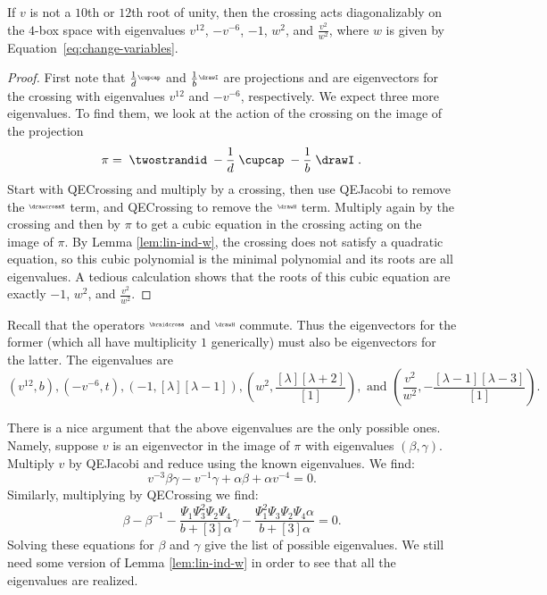 \documentclass[12pt]{amsart}
\begin{document}
\begin{lemma}\label{lem:eigenvalues-twist}
If $v$ is not a $10$th or $12$th root of unity, then the crossing acts
diagonalizably on the $4$-box space with eigenvalues $v^{12}$, $-v^{-6}$,
$-1$, $w^2$, and $\frac{v^2}{w^2}$, where $w$ is given by
Equation~\eqref{eq:change-variables}.
\end{lemma}
\begin{proof}
First note that $\frac{1}{d} \raisebox{0.8mm}{\scalebox{0.5}{\cupcap}}$ and $\frac{1}{b} \raisebox{0.8mm}{\scalebox{0.5}{\drawI}}$ are projections
and are eigenvectors for the crossing with eigenvalues $v^{12}$ and
$-v^{-6}$, respectively. We expect three more eigenvalues.
To find them, we look at the action of the crossing
on the image of the projection
$$\pi = \;\twostrandid\; -\frac{1}{d}\;\cupcap\; -\frac{1}{b}\;\drawI\;.$$
Start with QECrossing and multiply by a crossing, then use QEJacobi to remove
the $\raisebox{0.8mm}{\scalebox{0.5}{\drawcrossX}}$ term, and QECrossing to remove the $\raisebox{0.8mm}{\scalebox{0.5}{\drawH}}$ term.  Multiply
again by the crossing and then by $\pi$ to get a cubic equation in the
crossing acting on the image of $\pi$.  By Lemma \ref{lem:lin-ind-w}, the
crossing does not satisfy a quadratic equation, so this cubic polynomial is
the minimal polynomial and its roots are all eigenvalues.  A tedious
calculation shows that the roots of this cubic equation are exactly $-1$,
$w^2$, and $\frac{v^2}{w^2}$.
\end{proof}

\begin{remark}
Recall that the operators $\raisebox{0.8mm}{\scalebox{0.5}{\braidcross}}$ and 
$\raisebox{0.8mm}{\scalebox{0.5}{\drawH}}$ commute.
Thus the eigenvectors for the former (which all have multiplicity $1$
generically) must also be eigenvectors for the latter.  The eigenvalues are
$$\left(v^{12}, b\right), \left(-v^{-6},t\right), \left(-1, [\lambda][\lambda-1]\right), \left(w^2,
\frac{[\lambda][\lambda+2]}{[1]}\right), \text{ and } \left(\frac{v^2}{w^2},
-\frac{[\lambda-1][\lambda-3]}{[1]}\right).$$

There is a nice argument that the above eigenvalues are the only possible
ones.  Namely, suppose $v$ is an eigenvector in the image of $\pi$
with eigenvalues $(\beta, \gamma)$. Multiply $v$ by QEJacobi and reduce
using the known eigenvalues. We find:
$$v^{-3} \beta \gamma -v^{-1} \gamma + \alpha \beta + \alpha v^{-4} = 0.$$
Similarly, multiplying by QECrossing we find:
$$\beta-\beta^{-1} - \frac{\Psi_1 \Psi_3^2 \Psi_2 \Psi_4}{b+[3]\alpha} \gamma - \frac{\Psi_1^2 \Psi_3 \Psi_2 \Psi_4 \alpha}{b+[3]\alpha} = 0.$$
Solving these equations for $\beta$ and $\gamma$ give the list of possible eigenvalues.  We still need some version of Lemma \ref{lem:lin-ind-w} in order to see that all the eigenvalues are realized.
\end{remark}
\end{document}

